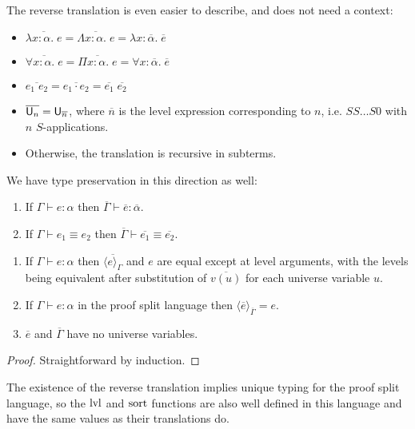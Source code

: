 The reverse translation is even easier to describe, and does not need a context:
\begin{itemize}
\item $\overline{\lambda x:\alpha.\;e}=\overline{\Lambda x:\alpha.\;e}=\lambda x:\overline \alpha.\;\overline e$
\item $\overline{\forall x:\alpha.\;e}=\overline{\Pi x:\alpha.\;e}=\forall x:\overline \alpha.\;\overline e$
\item $\overline{e_1\;e_2}=\overline{e_1\cdot e_2}=\overline{e_1}\;\overline{e_2}$
\item $\overline{\mathsf{U}_n}=\mathsf{U}_{\overline n}$, where $\overline n$ is the level expression corresponding to $n$, i.e. $SS\dots S0$ with $n$ $S$-applications.
\item Otherwise, the translation is recursive in subterms.
\end{itemize}

We have type preservation in this direction as well:
\begin{lemma}
\begin{enumerate}
\item If $\Gamma\vdash e:\alpha$ then $\overline \Gamma\vdash \overline e:\overline \alpha$.
\item If $\Gamma\vdash e_1\equiv e_2$ then $\overline \Gamma\vdash \overline {e_1}\equiv \overline {e_2}$.
\end{enumerate}
\end{lemma}
\begin{lemma}
\begin{enumerate}
\item If $\Gamma\vdash e:\alpha$ then $\overline{\langle e\rangle_\Gamma}$ and $e$ are equal except at level arguments, with the levels being equivalent after substitution of $\overline{v(u)}$ for each universe variable $u$.
\item If $\Gamma\vdash e:\alpha$ in the proof split language then $\langle\overline{e}\rangle_{\overline{\Gamma}}=e$.
\item $\overline{e}$ and $\overline{\Gamma}$ have no universe variables.
\end{enumerate}
\end{lemma}
\begin{proof}
Straightforward by induction.
\end{proof}
The existence of the reverse translation implies unique typing for the proof split language, so the $\operatorname{lvl}$ and $\operatorname{sort}$ functions are also well defined in this language and have the same values as their translations do.

